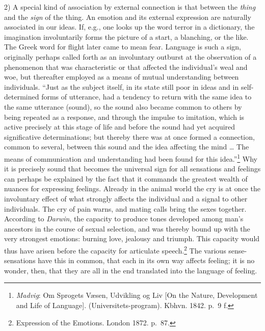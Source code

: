\documentclass[12pt,a4paper]{book}
\newcommand{\opage}[1]{\marginnote{\footnotesize\textit{[#1]}}}
\begin{document}
2) A special kind of association by external connection is that between
the \emph{thing} and the \emph{sign} of the thing. An emotion and its
external expression are naturally associated in our ideas. If, e.g., one
looks up the word terror in a dictionary, the imagination involuntarily
forms the picture of a start, a blanching, or the like. The Greek word
for flight later came to mean fear. Language is such a sign, originally
perhaps called forth as an involuntary outburst at
\opage{191}the observation of a phenomenon that was characteristic or
that affected the individual's weal and woe, but thereafter employed as
a means of mutual understanding between individuals. ``Just as the
subject itself, in its state still poor in ideas and in self-determined
forms of utterance, had a tendency to return with the same idea to the
same utterance (sound), so the sound also became common to others by
being repeated as a response, and through the impulse to imitation,
which is active precisely at this stage of life and before the sound had
yet acquired significative determinations; but thereby there was at once
formed a connection, common to several, between this sound and the idea
affecting the mind \ldots{} The means of communication and understanding
had been found for this
idea.''\footnote{\emph{Madvig}: Om Sprogets Væsen, Udvikling og Liv
[On the Nature, Development and Life of Language].
(Universitets-program). Kbhvn. 1842. p.~9 f.} Why it is precisely sound
that becomes the universal sign for all sensations and feelings can
perhaps be explained by the fact that it commands the greatest wealth of
nuances for expressing feelings. Already in the animal world the cry is
at once the involuntary effect of what strongly affects the individual
and a signal to other individuals. The cry of pain warns, and mating
calls bring the sexes together. According to \emph{Darwin}, the capacity
to produce tones developed among man's ancestors in the course of sexual
selection, and was thereby bound up with the very strongest emotions:
burning love, jealousy and triumph. This capacity would thus have arisen
before the capacity for
articulate speech.\footnote{Expression of the Emotions. London 1872.
p.~87.} The various sense-sensations have this in common, that each in
its own way affects feeling; it is no wonder, then, that they are all in
the end translated into the language of feeling.
\end{document}
